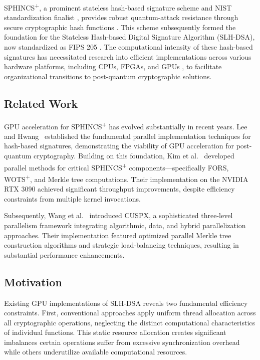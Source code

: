 \documentclass[journal]{IEEEtran}
\begin{document}
SPHINCS\textsuperscript{+}, a prominent stateless hash-based signature scheme and NIST standardization finalist \cite{Yesina}, provides robust quantum-attack resistance through secure cryptographic hash functions \cite{Bernstein2019}. This scheme subsequently formed the foundation for the Stateless Hash-based Digital Signature Algorithm (SLH-DSA), now standardized as FIPS 205 \cite{FIPS205}. The computational intensity of these hash-based signatures has necessitated research into efficient implementations across various hardware platforms, including CPUs, FPGAs, and GPUs \cite{Joseph2022}, to facilitate organizational transitions to post-quantum cryptographic solutions.

\subsection{Related Work}

GPU acceleration for SPHINCS\textsuperscript{+} has evolved substantially in recent years. Lee and Hwang~\cite{Lee2022} established the fundamental parallel implementation techniques for hash-based signatures, demonstrating the viability of GPU acceleration for post-quantum cryptography. Building on this foundation, Kim et al.~\cite{Kim2024} developed parallel methods for critical SPHINCS\textsuperscript{+} components—specifically FORS, WOTS\textsuperscript{+}, and Merkle tree computations. Their implementation on the NVIDIA RTX 3090 achieved significant throughput improvements, despite efficiency constraints from multiple kernel invocations.

Subsequently, Wang et al.~\cite{Wang2025} introduced CUSPX, a sophisticated three-level parallelism framework integrating algorithmic, data, and hybrid parallelization approaches. Their implementation featured optimized parallel Merkle tree construction algorithms and strategic load-balancing techniques, resulting in substantial performance enhancements.

\subsection{Motivation}

Existing GPU implementations of SLH-DSA reveals two fundamental efficiency constraints.
First, conventional approaches apply uniform thread allocation across all cryptographic operations, neglecting the distinct computational characteristics of individual functions. This static resource allocation creates significant imbalances certain operations suffer from excessive synchronization overhead while others underutilize available computational resources.
\end{document}
